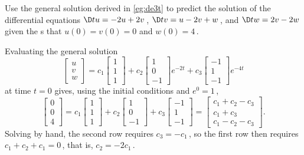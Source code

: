 \begin{example} 
Use the general solution derived in \autoref{eg:de3t} to predict the solution of the differential equations \(\D tu=-2u+2v\)\,, \(\D tv=u-2v+w\)\,, and \(\D tw=2v-2w\) given the s that \(u(0)=v(0)=0\) and \(w(0)=4\)\,.
\begin{solution} 
Evaluating the general solution
\begin{equation*}
\begin{bmatrix} u\\v\\w \end{bmatrix}
=c_1\begin{bmatrix} 1\\1\\1 \end{bmatrix}
+c_2\begin{bmatrix} 1\\0\\-1 \end{bmatrix}e^{-2t}
+c_3\begin{bmatrix} -1\\1\\-1 \end{bmatrix}e^{-4t}
\end{equation*}
at time \(t=0\) gives, using the initial conditions and \(e^0=1\)\,,
\begin{equation*}
\begin{bmatrix} 0\\0\\4 \end{bmatrix}
=c_1\begin{bmatrix} 1\\1\\1 \end{bmatrix}
+c_2\begin{bmatrix} 1\\0\\-1 \end{bmatrix}
+c_3\begin{bmatrix} -1\\1\\-1 \end{bmatrix}
=\begin{bmatrix} c_1+c_2-c_3\\c_1+c_3\\c_1-c_2-c_3 \end{bmatrix}.
\end{equation*}
Solving by hand, the second row requires \(c_3=-c_1\)\,, so the first row then requires \(c_1+c_2+c_1=0\)\,, that is, \(c_2=-2c_1\)\,.

\end{solution}
\end{example}
